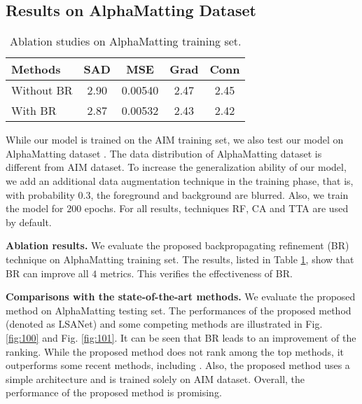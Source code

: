 \documentclass{article}
\theoremstyle{plain}
\begin{document}
\subsection{Results on AlphaMatting Dataset}

\begin{table}[b]
\centering
    \caption{
        Ablation studies on AlphaMatting training set.
}
    \label{tablewuwuwu}
\setlength\tabcolsep{4pt}
\begin{tabular}{|l|cccc|}
    \hline
    Methods & SAD & MSE & Grad & Conn  
  \\
    \hline
    Without BR
            & 2.90 &0.00540 & 2.47 & 2.45
    \\
    With BR
            & 2.87 & 0.00532 & 2.43 & 2.42
    \\
    \hline
\end{tabular}
\end{table}


While our model is trained
on the AIM training set, we also test our model on AlphaMatting dataset \cite{Rhemann2009APerceptually}.
The data distribution of AlphaMatting dataset is different from AIM dataset.
To increase the generalization ability of our model,
we add an additional data augmentation technique in the training phase, that is, with probability $0.3$, the foreground and background are blurred.
Also, we train the model for $200$ epochs.
For all results, techniques RF, CA and TTA are used by default.


\textbf{Ablation results.}
We evaluate the proposed backpropagating refinement (BR) technique on AlphaMatting training set.
The results, listed in Table \ref{tablewuwuwu},
show that BR can improve all $4$ metrics.
This verifies the effectiveness of BR.




\textbf{Comparisons with the state-of-the-art methods.}
We evaluate the proposed method on AlphaMatting testing set.
The performances of the proposed method (denoted as LSANet)
and some competing methods are illustrated in 
Fig. \ref{fig:100} and
Fig. \ref{fig:101}.
It can be seen that BR leads to an improvement of the ranking.
While the proposed method does not rank among the top methods, it outperforms some recent methods, including \cite{Tang2019Learning-Based,Li2020NaturalImageMatting,Dai2021LearningAffinityAware,Yu2021High-ResolutionDeepImageMatting}.
Also, the proposed method uses a simple architecture and is trained solely on AIM dataset.
Overall, the performance of the proposed method is promising.
\end{document}
